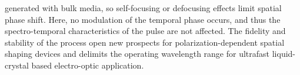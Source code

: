 generated with bulk media, so self-focusing or defocusing effects limit spatial phase shift. Here, no modulation of the temporal phase occurs, and thus the spectro-temporal characteristics of the pulse are not affected. The fidelity and stability of the process open new prospects for polarization-dependent spatial shaping devices and delimits the operating wavelength range for ultrafast liquid-crystal based electro-optic application.

\vspace{\baselineskip}
